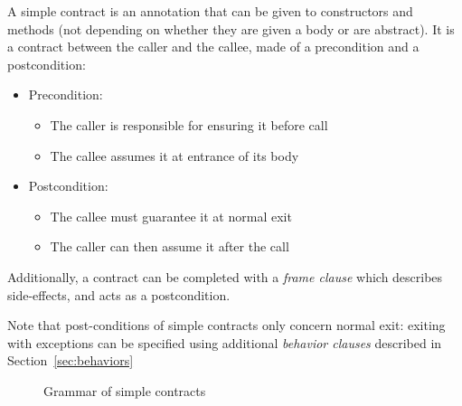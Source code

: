 \documentclass[a4paper,11pt,twoside,openright]{report}
\begin{document}
A simple contract is an annotation that can be given to constructors
and methods (not depending on whether they are given a body or are
abstract). It is a contract between the caller and the callee, made of
a precondition and a postcondition:
\begin{itemize}
\item Precondition:
  \begin{itemize}
  \item The caller is responsible for ensuring it before call
  \item The callee assumes it at entrance of its body
  \end{itemize}
\item Postcondition:
  \begin{itemize}
  \item The callee must guarantee it at normal exit
  \item The caller can then assume it after the call
  \end{itemize}
\end{itemize}
Additionally, a contract can be completed with a \emph{frame clause}
which describes side-effects, and acts as a postcondition.

Note that post-conditions of simple contracts only concern normal
exit: exiting with exceptions can be specified using additional
\emph{behavior clauses} described in Section~\ref{sec:behaviors}

\begin{figure}[t]
    \caption{Grammar of simple contracts}
  \label{fig:gram:contracts}
\end{figure}
\end{document}
